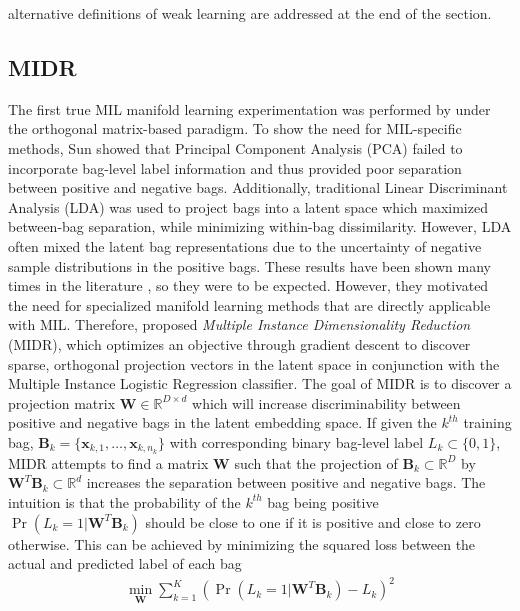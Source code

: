 alternative definitions of weak learning are addressed at the end of the section.

\subsection{MIDR} \label{sec:MIDR}
The first true MIL manifold learning experimentation was performed by \cite{Sun2010MIDR} under the orthogonal matrix-based paradigm.  To show the need for MIL-specific methods, Sun showed that Principal Component Analysis (PCA) failed to incorporate bag-level label information and thus provided poor separation between positive and negative bags.  Additionally, traditional Linear Discriminant Analysis (LDA) was used to project bags into a latent space which maximized between-bag separation, while minimizing within-bag dissimilarity.  However, LDA often mixed the latent bag representations due to the uncertainty of negative sample distributions in the positive bags.  These results have been shown many times in the literature \citep{Chao2019RecentAdvancesSupervisedDimRed,Vural2018StudySupervisedManifoldLearning}, so they were to be expected.  However, they motivated the need for specialized manifold learning methods that are directly applicable with MIL.  Therefore,  \cite{Sun2010MIDR} proposed \textit{Multiple Instance Dimensionality Reduction} (MIDR), which optimizes an objective through gradient descent to discover sparse, orthogonal projection vectors in the latent space in conjunction with the Multiple Instance Logistic Regression classifier.  The goal of MIDR is to discover a projection matrix $\bm{W} \in \mathbb{R}^{D \times d}$ which will increase discriminability between positive and negative bags in the latent embedding space.  If given the $k^{th}$ training bag, $\bm{B}_{k} = \{ \bm{x}_{k,1}, \dots, \bm{x}_{k,n_{k}} \}$ with corresponding binary bag-level label $L_k \subset \{0,1\}$, MIDR attempts to find a matrix $\bm{W}$ such that the projection of $\bm{B}_{k} \subset \mathbb{R}^{D}$ by $\bm{W}^{T}\bm{B}_{k} \subset \mathbb{R}^{d}$ increases the separation between positive and negative bags. The intuition is that the probability of the $k^{th}$ bag being positive $\Pr(L_{k}=1|\bm{W}^{T}\bm{B}_{k})$ should be close to one if it is positive and close to zero otherwise.  This can be achieved by minimizing the squared loss between the actual and predicted label of each bag
\begin{align}
	\min_{\bm{W}} \sum_{k=1}^{K} (\Pr(L_{k}=1|\bm{W}^{T}\bm{B}_{k}) - L_{k})^{2}
	\label{eq:MIDR_orig_objective}
\end{align}
